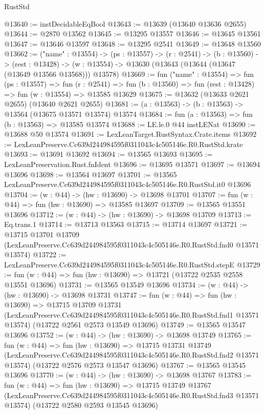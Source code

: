 \begin{lexlean}{RustStd}
\begin{coremodule}
@13640 := instDecidableEqBool
@13643 := @13639 (@13640 @13636 @2655)
@13644 := @2870 @13562
@13645 := @13295 @13557
@13646 := @13645 @13561
@13647 := @13646 @13597
@13648 := @13295 @2541
@13649 := @13648 @13560
@13662 := ("name" : @13554) ->
  (ps : @13557) ->
  (r : @2541) ->
  (b : @13560) ->
  (rest : @13428) -> (w : @13554) -> @13630 (@13643 (@13644 (@13647 (@13649 @13566 @13568))) @13578)
@13669 := fun ("name" : @13554) =>
  fun (ps : @13557) =>
  fun (r : @2541) => fun (b : @13560) => fun (rest : @13428) => fun (w : @13554) => @13585 @13629
@13675 := @13632 (@13633 @2621 @2655) (@13640 @2621 @2655)
@13681 := (a : @13563) -> (b : @13563) -> @13564 (@13675 @13571 @13574) @13574
@13684 := fun (a : @13563) => fun (b : @13563) => @13585 @13574
@13688 := LE.le.{0} @44 instLENat
@13690 := @13688 @50 @13574
@13691 := LexLeanTarget.RustSyntax.Crate.items
@13692 := LexLeanPreserve.Cc639d244984595f0311043c4c505146e.R0.RustStd.krate
@13693 := @13691 @13692
@13694 := @13565 @13693
@13695 := LexLeanPreservation.Rust.fnIdent
@13696 := @13695 @13571
@13697 := @13694 @13696
@13698 := @13564 @13697
@13701 := @13565 LexLeanPreserve.Cc639d244984595f0311043c4c505146e.R0.RustStd.it0 @13696
@13704 := (w : @44) -> (hw : @13690) -> @13698 @13701
@13707 := fun (w : @44) => fun (hw : @13690) => @13585 @13697
@13709 := @13565 @13551 @13696
@13712 := (w : @44) -> (hw : @13690) -> @13698 @13709
@13713 := Eq.trans.{1}
@13714 := @13713 @13563
@13715 := @13714 @13697
@13721 := @13715
    @13701
    @13709
    (LexLeanPreserve.Cc639d244984595f0311043c4c505146e.R0.RustStd.fnd0 @13571 @13574)
@13722 := LexLeanPreserve.Cc639d244984595f0311043c4c505146e.R0.RustStd.stepE
@13729 := fun (w : @44) => fun (hw : @13690) => @13721 (@13722 @2535 @2558 @13551 @13696)
@13731 := @13565 @13549 @13696
@13734 := (w : @44) -> (hw : @13690) -> @13698 @13731
@13747 := fun (w : @44) =>
  fun (hw : @13690) =>
  @13715
    @13709
    @13731
    (LexLeanPreserve.Cc639d244984595f0311043c4c505146e.R0.RustStd.fnd1 @13571 @13574)
    (@13722 @2561 @2573 @13549 @13696)
@13749 := @13565 @13547 @13696
@13752 := (w : @44) -> (hw : @13690) -> @13698 @13749
@13765 := fun (w : @44) =>
  fun (hw : @13690) =>
  @13715
    @13731
    @13749
    (LexLeanPreserve.Cc639d244984595f0311043c4c505146e.R0.RustStd.fnd2 @13571 @13574)
    (@13722 @2576 @2573 @13547 @13696)
@13767 := @13565 @13545 @13696
@13770 := (w : @44) -> (hw : @13690) -> @13698 @13767
@13783 := fun (w : @44) =>
  fun (hw : @13690) =>
  @13715
    @13749
    @13767
    (LexLeanPreserve.Cc639d244984595f0311043c4c505146e.R0.RustStd.fnd3 @13571 @13574)
    (@13722 @2580 @2593 @13545 @13696)

\end{coremodule}
\end{lexlean}
